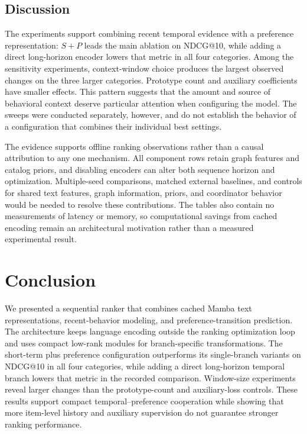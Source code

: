 \documentclass[11pt]{article}
\begin{document}
\subsection{Discussion}
The experiments support combining recent temporal evidence with a preference representation: $S+P$ leads the main ablation on NDCG@10, while adding a direct long-horizon encoder lowers that metric in all four categories. Among the sensitivity experiments, context-window choice produces the largest observed changes on the three larger categories. Prototype count and auxiliary coefficients have smaller effects. This pattern suggests that the amount and source of behavioral context deserve particular attention when configuring the model. The sweeps were conducted separately, however, and do not establish the behavior of a configuration that combines their individual best settings.

The evidence supports offline ranking observations rather than a causal attribution to any one mechanism. All component rows retain graph features and catalog priors, and disabling encoders can alter both sequence horizon and optimization. Multiple-seed comparisons, matched external baselines, and controls for shared text features, graph information, priors, and coordinator behavior would be needed to resolve these contributions. The tables also contain no measurements of latency or memory, so computational savings from cached encoding remain an architectural motivation rather than a measured experimental result.

\section{Conclusion}
We presented a sequential ranker that combines cached Mamba text representations, recent-behavior modeling, and preference-transition prediction. The architecture keeps language encoding outside the ranking optimization loop and uses compact low-rank modules for branch-specific transformations. The short-term plus preference configuration outperforms its single-branch variants on NDCG@10 in all four categories, while adding a direct long-horizon temporal branch lowers that metric in the recorded comparison. Window-size experiments reveal larger changes than the prototype-count and auxiliary-loss controls. These results support compact temporal--preference cooperation while showing that more item-level history and auxiliary supervision do not guarantee stronger ranking performance.
\end{document}
